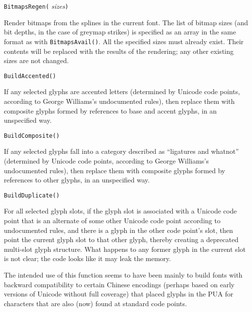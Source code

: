 

\texttt{BitmapsRegen(} \textit{sizes}\texttt{)}

Render bitmaps from the splines in the current font.  The list of bitmap
sizes (and bit depths, in the case of greymap strikes) is specified as an
array in the same format as with \texttt{BitmapsAvail()}.  All the specified
sizes must already exist.  Their contents will be replaced with the results
of the rendering; any other existing sizes are not changed.



\texttt{BuildAccented()}

If any selected glyphs are accented letters (determined by Unicode code
points, according to George Williams's undocumented rules), then replace
them with composite glyphs formed by references to base and accent glyphs,
in an unspecified way.



\texttt{BuildComposite()}

If any selected glyphs fall into a category described as ``ligatures and
whatnot'' (determined by Unicode code points, according to George Williams's
undocumented rules), then replace them with composite glyphs formed by
references to other glyphs, in an unspecified way.



\texttt{BuildDuplicate()}

For all selected glyph slots, if the glyph slot is associated with a Unicode
code point that is an alternate of some other Unicode code point according
to undocumented rules, and there is a glyph in the other code point's slot,
then point the current glyph slot to that other glyph, thereby creating a
deprecated multi-slot glyph structure.  What happens to any former glyph in
the current slot is not clear; the code looks like it may leak the memory.

The intended use of this function seems to have been mainly to build
fonts with backward compatibility to certain Chinese encodings (perhaps
based on early versions of Unicode without full coverage) that placed glyphs
in the PUA for characters that are also (now) found at standard code points.


